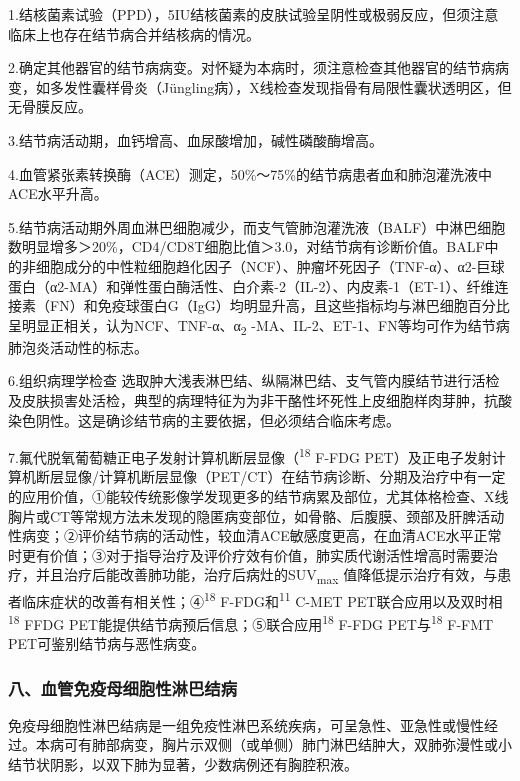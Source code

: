 1.结核菌素试验（PPD），5IU结核菌素的皮肤试验呈阴性或极弱反应，但须注意临床上也存在结节病合并结核病的情况。

2.确定其他器官的结节病病变。对怀疑为本病时，须注意检查其他器官的结节病病变，如多发性囊样骨炎（Jüngling病），X线检查发现指骨有局限性囊状透明区，但无骨膜反应。

3.结节病活动期，血钙增高、血尿酸增加，碱性磷酸酶增高。

4.血管紧张素转换酶（ACE）测定，50\%～75\%的结节病患者血和肺泡灌洗液中ACE水平升高。

5.结节病活动期外周血淋巴细胞减少，而支气管肺泡灌洗液（BALF）中淋巴细胞数明显增多＞20\%，CD4/CD8T细胞比值＞3.0，对结节病有诊断价值。BALF中的非细胞成分的中性粒细胞趋化因子（NCF）、肿瘤坏死因子（TNF-α）、α2-巨球蛋白（α2-MA）和弹性蛋白酶活性、白介素-2（IL-2）、内皮素-1（ET-1）、纤维连接素（FN）和免疫球蛋白G（IgG）均明显升高，且这些指标均与淋巴细胞百分比呈明显正相关，认为NCF、TNF-α、α\textsubscript{2}
-MA、IL-2、ET-1、FN等均可作为结节病肺泡炎活动性的标志。

6.组织病理学检查
选取肿大浅表淋巴结、纵隔淋巴结、支气管内膜结节进行活检及皮肤损害处活检，典型的病理特征为为非干酪性坏死性上皮细胞样肉芽肿，抗酸染色阴性。这是确诊结节病的主要依据，但必须结合临床考虑。

7.氟代脱氧葡萄糖正电子发射计算机断层显像（\textsuperscript{18} F-FDG
PET）及正电子发射计算机断层显像/计算机断层显像（PET/CT）在结节病诊断、分期及治疗中有一定的应用价值，①能较传统影像学发现更多的结节病累及部位，尤其体格检查、X线胸片或CT等常规方法未发现的隐匿病变部位，如骨骼、后腹膜、颈部及肝脾活动性病变；②评价结节病的活动性，较血清ACE敏感度更高，在血清ACE水平正常时更有价值；③对于指导治疗及评价疗效有价值，肺实质代谢活性增高时需要治疗，并且治疗后能改善肺功能，治疗后病灶的SUV\textsubscript{max}
值降低提示治疗有效，与患者临床症状的改善有相关性；④\textsuperscript{18}
F-FDG和\textsuperscript{11} C-MET
PET联合应用以及双时相\textsuperscript{18} FFDG
PET能提供结节病预后信息；⑤联合应用\textsuperscript{18} F-FDG
PET与\textsuperscript{18} F-FMT PET可鉴别结节病与恶性病变。

\subsubsection{八、血管免疫母细胞性淋巴结病}

免疫母细胞性淋巴结病是一组免疫性淋巴系统疾病，可呈急性、亚急性或慢性经过。本病可有肺部病变，胸片示双侧（或单侧）肺门淋巴结肿大，双肺弥漫性或小结节状阴影，以双下肺为显著，少数病例还有胸腔积液。

\protect\hypertarget{text00081.html}{}{}

